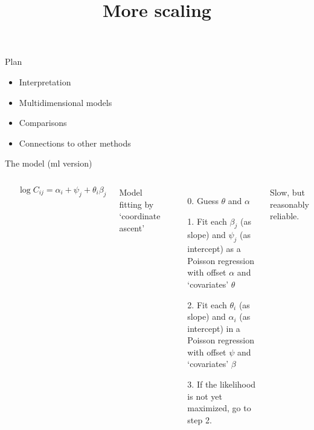 \documentclass{hertieteaching}
\title{More scaling}
\begin{document}
{
\begin{frame}
\maketitle
\end{frame}}
\addtocounter{page}{-1}

\begin{frame}{Plan}
\begin{itemize}
  \item Interpretation
  \item Multidimensional models
  \item Comparisons 
  \item Connections to other methods
\end{itemize}

\end{frame}

\begin{frame}{The model (ml version)}

\begin{columns}[T,onlytextwidth]

\begin{center}
\end{center}

\medskip
\smallskip
$$
\log C_\mathit{ij} = \alpha_i + \psi_j + \theta_i \beta_j
$$

Model fitting by `coordinate ascent' \parencite{Goodman1979}
\begin{itemize}
  \item[0.] Guess $\theta$ and $\alpha$
  \item[1.] Fit each $\beta_j$ (as slope) and $\psi_j$ (as intercept) as a Poisson regression with offset $\alpha$ and `covariates' $\theta$
  \item[2.] Fit each $\theta_i$ (as slope) and $\alpha_i$ (as intercept) in a  Poisson regression with offset $\psi$ and `covariates' $\beta$
  \item[3.] If the likelihood is not yet maximized, go to step 2. 
\end{itemize}
Slow, but reasonably reliable.
\end{columns}

\end{frame}
\end{document}
